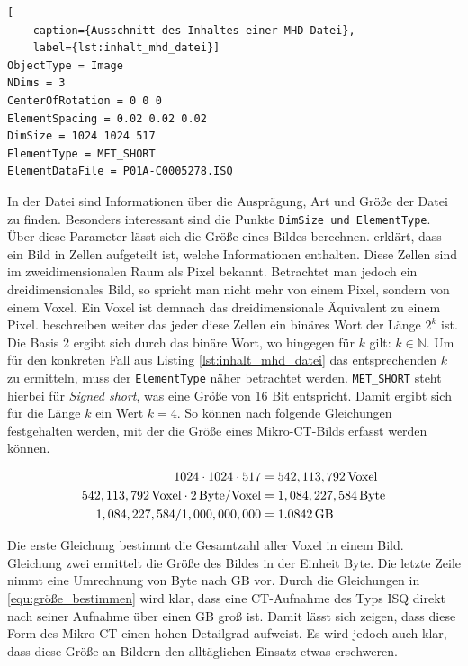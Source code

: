 \begin{lstlisting}[
	caption={Ausschnitt des Inhaltes einer MHD-Datei},
	label={lst:inhalt_mhd_datei}]
ObjectType = Image
NDims = 3
CenterOfRotation = 0 0 0
ElementSpacing = 0.02 0.02 0.02
DimSize = 1024 1024 517
ElementType = MET_SHORT
ElementDataFile = P01A-C0005278.ISQ
\end{lstlisting}

In der Datei sind Informationen über die Ausprägung, Art und Größe der Datei zu finden.
Besonders interessant sind die Punkte \texttt{DimSize und ElementType}. Über
diese Parameter lässt sich die Größe eines Bildes berechnen. \citet[S.~10-11]{burger2009}
erklärt, dass ein Bild in Zellen aufgeteilt ist, welche Informationen enthalten.
Diese Zellen sind im zweidimensionalen Raum als Pixel bekannt. Betrachtet man
jedoch ein dreidimensionales Bild, so spricht man nicht mehr von einem Pixel,
sondern von einem Voxel. Ein Voxel ist demnach das dreidimensionale Äquivalent zu
einem Pixel. \citet[S.~10-11]{burger2009} beschreiben weiter das jeder diese Zellen
ein binäres Wort der Länge $2^{k}$ ist. Die Basis 2 ergibt sich durch das binäre
Wort, wo hingegen für $k$ gilt: $k \in \mathbb{N}$. Um für den konkreten Fall aus
Listing \ref{lst:inhalt_mhd_datei} das entsprechenden $k$ zu ermitteln, muss der
\texttt{ElementType} näher betrachtet werden. \texttt{MET\_SHORT} steht hierbei für
\textit{Signed short}, was eine Größe von 16 Bit entspricht. Damit ergibt sich
für die Länge $k$ ein Wert $k = 4$. So können nach \citet[S.~10-11]{burger2009}
folgende Gleichungen festgehalten werden, mit der die Größe eines Mikro-\ac{CT}-Bilds
erfasst werden können.

\begin{align}
	\label{equ:größe_bestimmen}1024 \cdot 1024 \cdot 517    & = 542,113,792 \, \text{Voxel}\notag  \\
	542,113,792 \, \text{Voxel}\cdot 2 \, \text{Byte/Voxel} & = 1,084,227,584 \, \text{Byte}\notag \\
	1,084,227,584 / 1,000,000,000                           & = 1.0842 \, \text{GB}
\end{align}

Die erste Gleichung bestimmt die Gesamtzahl aller Voxel in einem Bild. Gleichung
zwei ermittelt die Größe des Bildes in der Einheit Byte. Die letzte Zeile nimmt eine
Umrechnung von Byte nach \ac{GB} vor. Durch die Gleichungen in \ref{equ:größe_bestimmen}
wird klar, dass eine \ac{CT}-Aufnahme des Typs \ac{ISQ} direkt nach seiner
Aufnahme über einen \ac{GB} groß ist. Damit lässt sich zeigen, dass diese Form des
Mikro-\ac{CT} einen hohen Detailgrad aufweist. Es wird jedoch auch klar, dass
diese Größe an Bildern den alltäglichen Einsatz etwas erschweren.

